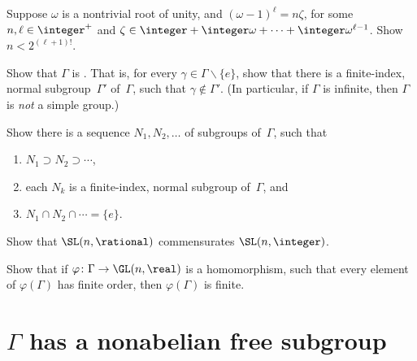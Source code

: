 \begin{exercises}
\item \label{NoTorsOmega/p}
 Suppose $\omega$ is a nontrivial root of unity, and $(\omega-1)^\ell = n \zeta$, for some $n,\ell
\in \integer^+$ and
$\zeta \in \integer + \integer
\omega + \cdots + \integer \omega^{\ell-1}$. Show $n < 2^{(\ell+1)!}$.

\item \label{GammaResidFinite}
 Show that $\Gamma$ is . That is,
for every $\gamma \in \Gamma \smallsetminus \{e\}$, show
that there is a finite-index, normal subgroup~$\Gamma'$
of~$\Gamma$, such that $\gamma \notin \Gamma'$. (In
particular, if $\Gamma$ is infinite, then $\Gamma$ is \emph{not} a simple group.)

\item \label{GammaNormSubgrpsToE}
 Show there is a sequence $N_1, N_2, \ldots$ of
subgroups of~$\Gamma$, such that
 \begin{enumerate}
 \item $N_1 \supset N_2 \supset \cdots$,
 \item each $N_k$ is a finite-index, normal subgroup
of~$\Gamma$,
 and
 \item $N_1 \cap N_2 \cap \cdots = \{e\}$.
 \end{enumerate}

\item \label{SLQCommSLZ}
 Show that $\SL(n,\rational)$ commensurates
$\SL(n,\integer)$. 

\item \label{ImgNotTorsion}
Show that if $\varphi \colon \Gamma \to \GL(n,\real)$ is a homomorphism, such that every element of $\varphi(\Gamma)$ has finite order, then $\varphi(\Gamma)$ is finite.  

\end{exercises}





\section{\texorpdfstring{$\Gamma$ has a nonabelian free subgroup}%
	{Γ has a nonabelian free subgroup}}
\label{TitsAlternativeSect}

